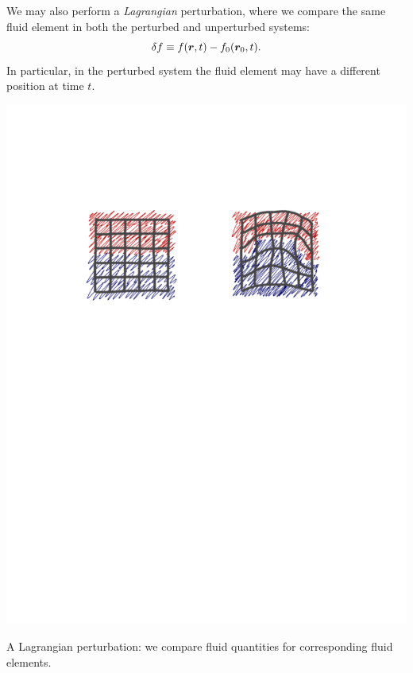 We may also perform a \emph{Lagrangian} perturbation, where we compare the same fluid element in both the perturbed and unperturbed systems:
\begin{equation}
 \delta f \equiv f(\boldsymbol{r},t) - f_{0}(\boldsymbol{r}_{0},t).
\end{equation}
In particular, in the perturbed system the fluid element may have a different position at time $t$.
\begin{marginfigure}
\includegraphics[width=\linewidth]{graphics/lagrangian}
\caption{\label{f.lagrangian-grid} A Lagrangian perturbation: we compare fluid quantities for corresponding fluid elements.}
\end{marginfigure}

